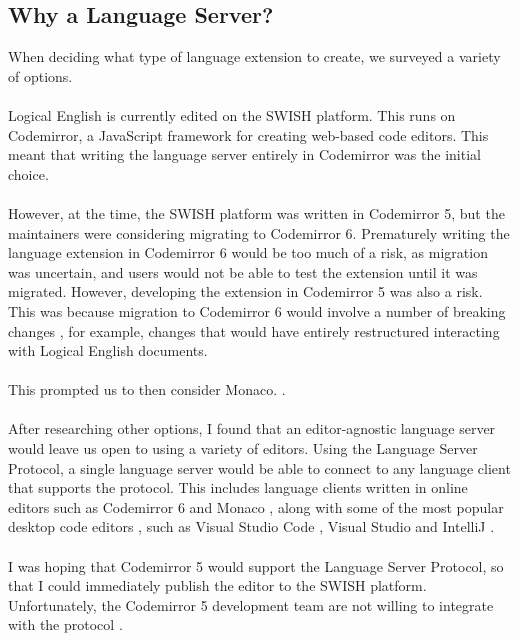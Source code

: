 \documentclass[../main.tex]{subfiles}
\begin{document}
\subsection{Why a Language Server?}
When deciding what type of language extension to create, we surveyed a variety of options. 
\\
\\
Logical English is currently edited on the SWISH platform. This runs on Codemirror, a JavaScript framework for creating web-based code editors. This meant that writing the language server entirely in Codemirror was the initial choice.
\\
\\
However, at the time, the SWISH platform was written in Codemirror 5, but the maintainers were considering migrating to Codemirror 6. Prematurely writing the language extension in Codemirror 6 would be too much of a risk, as migration was uncertain, and users would not be able to test the extension until it was migrated. However, developing the extension in Codemirror 5 was also a risk. This was because migration to Codemirror 6 would involve a number of breaking changes \cite{codemirror_migration}, for example, changes that would have entirely restructured interacting with Logical English documents.
\\ 
\\ 
This prompted us to then consider Monaco. .
\\ 
\\ 
After researching other options, I found that an editor-agnostic language server would leave us open to using a variety of editors. Using the Language Server Protocol, a single language server would be able to connect to any language client that supports the protocol. This includes language clients written in online editors such as Codemirror 6 \cite{codemirror_6_language_server} and Monaco \cite{monaco_language_server}, along with some of the most popular desktop code editors \cite{ide_rankings}, such as Visual Studio Code \cite{vsc_langserver_docs}, Visual Studio \cite{visual_studio_language_server} and IntelliJ \cite{intellij_language_server}. 
\\
\\
I was hoping that Codemirror 5 would support the Language Server Protocol, so that I could immediately publish the editor to the SWISH platform. Unfortunately, the Codemirror 5 development team are not willing to integrate with the protocol \cite{codemirror5_no_lsp}. 
\end{document}
